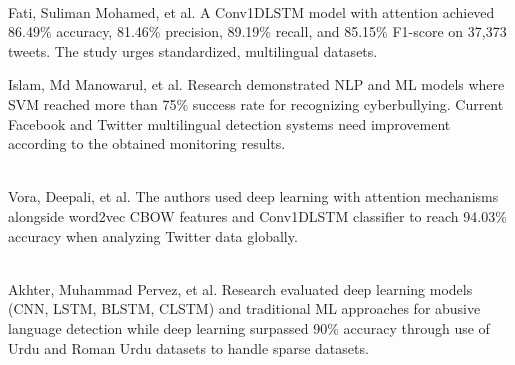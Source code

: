 \documentclass[pdflatex,sn-mathphys-num]{sn-jnl}%
\theoremstyle{thmstyleone}%
\theoremstyle{thmstyletwo}%
\theoremstyle{thmstylethree}%
\begin{document}

\\Fati, Suliman Mohamed, et al. \cite{bib9}
A Conv1DLSTM model with attention achieved 86.49\% accuracy, 81.46\% precision, 89.19\% recall, and 85.15\% F1-score on 37,373 tweets. The study urges standardized, multilingual datasets.

Islam, Md Manowarul, et al. \cite{bib10}
Research demonstrated NLP and ML models where SVM reached more than 75\% success rate for recognizing cyberbullying. Current Facebook and Twitter multilingual detection systems need improvement according to the obtained monitoring results.

\\Vora, Deepali, et al. \cite{bib11}
The authors used deep learning with attention mechanisms alongside word2vec CBOW features and Conv1DLSTM classifier to reach 94.03\% accuracy when analyzing Twitter data globally.



\\Akhter, Muhammad Pervez, et al. \cite{bib14}
Research evaluated deep learning models (CNN, LSTM, BLSTM, CLSTM) and traditional ML approaches for abusive language detection while deep learning surpassed 90\% accuracy through use of Urdu and Roman Urdu datasets to handle sparse datasets.
\end{document}
